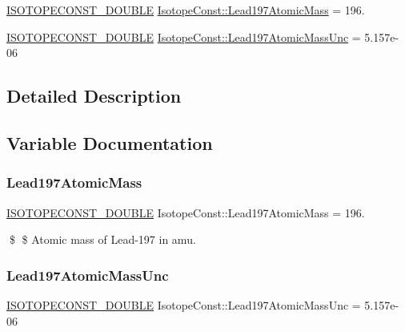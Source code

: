 \begin{DoxyCompactItemize}
\item 
\mbox{\hyperlink{group___isotope_const-_macros_ga8f45a7272ce02c0b4c65c44636ed719a}{I\+S\+O\+T\+O\+P\+E\+C\+O\+N\+S\+T\+\_\+\+D\+O\+U\+B\+LE}} \mbox{\hyperlink{group___isotope_const-_lead-_pb197_ga4a7a9e4f767678893805a6cb75692b04}{Isotope\+Const\+::\+Lead197\+Atomic\+Mass}} = 196.
\item 
\mbox{\hyperlink{group___isotope_const-_macros_ga8f45a7272ce02c0b4c65c44636ed719a}{I\+S\+O\+T\+O\+P\+E\+C\+O\+N\+S\+T\+\_\+\+D\+O\+U\+B\+LE}} \mbox{\hyperlink{group___isotope_const-_lead-_pb197_gadf146502a16731b755e43e0b823f8247}{Isotope\+Const\+::\+Lead197\+Atomic\+Mass\+Unc}} = 5.\+157e-\/06
\end{DoxyCompactItemize}


\subsection{Detailed Description}


\subsection{Variable Documentation}
\mbox{\label{group___isotope_const-_lead-_pb197_ga4a7a9e4f767678893805a6cb75692b04}} 
\subsubsection{\texorpdfstring{Lead197\+Atomic\+Mass}{Lead197AtomicMass}}
{\footnotesize\ttfamily \mbox{\hyperlink{group___isotope_const-_macros_ga8f45a7272ce02c0b4c65c44636ed719a}{I\+S\+O\+T\+O\+P\+E\+C\+O\+N\+S\+T\+\_\+\+D\+O\+U\+B\+LE}} Isotope\+Const\+::\+Lead197\+Atomic\+Mass = 196.}

\$ \$ Atomic mass of Lead-\/197 in amu. \mbox{\label{group___isotope_const-_lead-_pb197_gadf146502a16731b755e43e0b823f8247}} 
\subsubsection{\texorpdfstring{Lead197\+Atomic\+Mass\+Unc}{Lead197AtomicMassUnc}}
{\footnotesize\ttfamily \mbox{\hyperlink{group___isotope_const-_macros_ga8f45a7272ce02c0b4c65c44636ed719a}{I\+S\+O\+T\+O\+P\+E\+C\+O\+N\+S\+T\+\_\+\+D\+O\+U\+B\+LE}} Isotope\+Const\+::\+Lead197\+Atomic\+Mass\+Unc = 5.\+157e-\/06}


